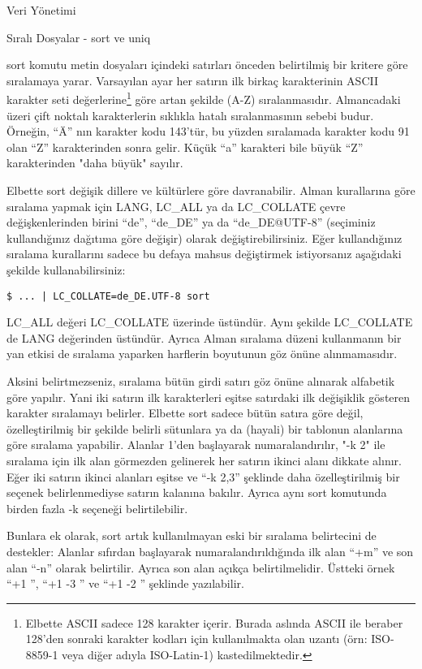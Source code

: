 \begin{section}{Veri Yönetimi}
\begin{subsection}{Sıralı Dosyalar - sort ve uniq}

sort komutu metin dosyaları içindeki satırları önceden belirtilmiş bir kritere göre sıralamaya yarar. Varsayılan ayar her satırın ilk birkaç karakterinin ASCII karakter seti değerlerine\footnote{Elbette ASCII sadece 128 karakter içerir. Burada aslında ASCII ile beraber 128'den sonraki karakter kodları için kullanılmakta olan uzantı (örn: ISO-8859-1 veya diğer adıyla ISO-Latin-1) kastedilmektedir.} göre artan şekilde (A-Z) sıralanmasıdır. Almancadaki üzeri çift noktalı karakterlerin sıklıkla hatalı sıralanmasının sebebi budur. Örneğin, “Ä” nın karakter kodu 143'tür, bu yüzden sıralamada karakter kodu 91 olan “Z” karakterinden sonra gelir. Küçük “a” karakteri bile büyük “Z” karakterinden "daha büyük" sayılır.

Elbette sort değişik dillere ve kültürlere göre davranabilir. Alman kurallarına göre sıralama yapmak için LANG, LC\_ALL ya da LC\_COLLATE  çevre değişkenlerinden birini “de”, “de\_DE” ya da “de\_DE@UTF-8” (seçiminiz kullandığınız dağıtıma göre değişir) olarak değiştirebilirsiniz. Eğer kullandığınız sıralama kurallarını sadece bu defaya mahsus değiştirmek istiyorsanız aşağıdaki şekilde kullanabilirsiniz:
\begin{verbatim}
$ ... | LC_COLLATE=de_DE.UTF-8 sort
\end{verbatim}

LC\_ALL değeri LC\_COLLATE üzerinde üstündür. Aynı şekilde LC\_COLLATE de LANG değerinden üstündür. Ayrıca Alman sıralama düzeni kullanmanın bir yan etkisi de sıralama yaparken harflerin boyutunun göz önüne alınmamasıdır.

Aksini belirtmezseniz, sıralama bütün girdi satırı göz önüne alınarak alfabetik göre yapılır. Yani iki satırın ilk karakterleri eşitse satırdaki ilk değişiklik gösteren karakter sıralamayı belirler. Elbette sort sadece bütün satıra göre değil, özelleştirilmiş bir şekilde belirli sütunlara ya da (hayali) bir tablonun alanlarına göre sıralama yapabilir. Alanlar 1'den başlayarak numaralandırılır, "-k 2" ile sıralama için ilk alan görmezden gelinerek her satırın ikinci alanı dikkate alınır. Eğer iki satırın ikinci alanları eşitse ve “-k 2,3” şeklinde daha özelleştirilmiş bir seçenek belirlenmediyse satırın kalanına bakılır. Ayrıca aynı sort komutunda birden fazla -k seçeneği belirtilebilir.

Bunlara ek olarak, sort artık kullanılmayan eski bir sıralama belirtecini de destekler: Alanlar sıfırdan başlayarak numaralandırıldığında ilk alan “+m” ve son alan “-n” olarak belirtilir. Ayrıca son alan açıkça belirtilmelidir. Üstteki örnek “+1 ”, “+1 -3 ” ve “+1 -2 ” şeklinde yazılabilir.


\end{subsection}
\end{section}
